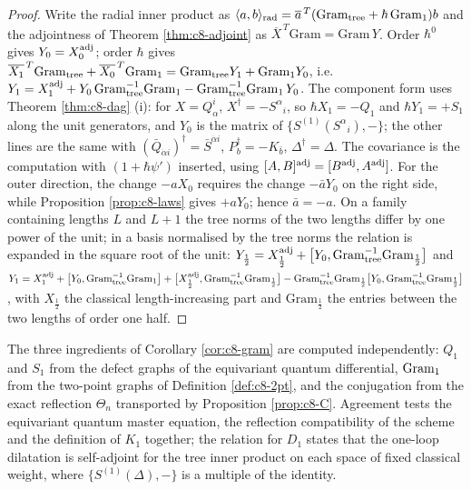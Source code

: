 \begin{proof}
Write the radial inner product as $\langle a,b\rangle_{\rm rad}=\overline a^{\,T}(\mathrm{Gram}_{\rm tree}+\hbar\,\mathrm{Gram}_{\rm 1})b$ and the adjointness of Theorem \ref{thm:c8-adjoint} as $\overline{X}^{\,T}\mathrm{Gram}=\mathrm{Gram}\,Y$. Order $\hbar^0$ gives $Y_0=X_0^{\rm adj}$; order $\hbar$ gives $\overline{X_1}^{\,T}\mathrm{Gram}_{\rm tree}+\overline{X_0}^{\,T}\mathrm{Gram}_{\rm 1}=\mathrm{Gram}_{\rm tree}Y_1+\mathrm{Gram}_{\rm 1}Y_0$, i.e. $Y_1=X_1^{\rm adj}+Y_0\,\mathrm{Gram}_{\rm tree}^{-1}\mathrm{Gram}_{\rm 1}-\mathrm{Gram}_{\rm tree}^{-1}\mathrm{Gram}_{\rm 1}\,Y_0$. The component form uses Theorem \ref{thm:c8-dag} (i): for $X=Q^i_\alpha$, $X^\dagger=-S^\alpha{}_i$, so $\hbar X_1=-Q_1$ and $\hbar Y_1=+S_1$ along the unit generators, and $Y_0$ is the matrix of $\{S^{(1)}(S^\alpha{}_i),-\}$; the other lines are the same with $(\bar Q_{\dot\alpha i})^\dagger=\bar S^{\dot\alpha i}$, $P_b^\dagger=-K_{\bar b}$, $\Delta^\dagger=\Delta$. The covariance is the computation with $(1+\hbar\psi')$ inserted, using $[A,B]^{\rm adj}=[B^{\rm adj},A^{\rm adj}]$. For the outer direction, the change $-aX_0$ requires the change $-\bar aY_0$ on the right side, while Proposition \ref{prop:c8-laws} gives $+aY_0$; hence $\bar a=-a$. On a family containing lengths $L$ and $L+1$ the tree norms of the two lengths differ by one power of the unit; in a basis normalised by the tree norms the relation is expanded in the square root of the unit: $Y_{\frac12}=X_{\frac12}^{\rm adj}+\big[Y_0,\mathrm{Gram}_{\rm tree}^{-1}\mathrm{Gram}_{\frac12}\big]$ and $Y_1=X_1^{\rm adj}+\big[Y_0,\mathrm{Gram}_{\rm tree}^{-1}\mathrm{Gram}_1\big]+\big[X_{\frac12}^{\rm adj},\mathrm{Gram}_{\rm tree}^{-1}\mathrm{Gram}_{\frac12}\big]-\mathrm{Gram}_{\rm tree}^{-1}\mathrm{Gram}_{\frac12}\big[Y_0,\mathrm{Gram}_{\rm tree}^{-1}\mathrm{Gram}_{\frac12}\big]$, with $X_{\frac12}$ the classical length-increasing part and $\mathrm{Gram}_{\frac12}$ the entries between the two lengths of order one half.
\end{proof}

\begin{remark}
The three ingredients of Corollary \ref{cor:c8-gram} are computed independently: $Q_1$ and $S_1$ from the defect graphs of the equivariant quantum differential, $\mathrm{Gram}_{\rm 1}$ from the two-point graphs of Definition \ref{def:c8-2pt}, and the conjugation from the exact reflection $\Theta_n$ transported by Proposition \ref{prop:c8-C}. Agreement tests the equivariant quantum master equation, the reflection compatibility of the scheme and the definition of $K_1$ together; the relation for $D_1$ states that the one-loop dilatation is self-adjoint for the tree inner product on each space of fixed classical weight, where $\{S^{(1)}(\Delta),-\}$ is a multiple of the identity.
\end{remark}

